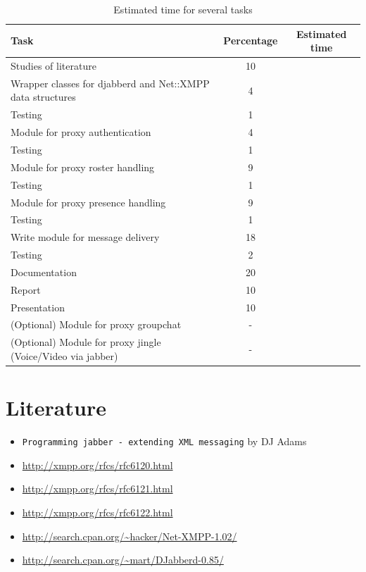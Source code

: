 \documentclass[a4paper,10pt,numbers=noendperiod]{scrartcl}
\begin{document}
\begin{table}[h]
	\centering
	\begin{tabular}{|l|c|c|}
	\hline
	\textbf{Task} & \textbf{Percentage} & \textbf{Estimated time} \\
	\hline
	\hline
	Studies of literature & 10 & \\
	\hline
	Wrapper classes for djabberd and Net::XMPP data structures & 4 & \\
	Testing & 1 & \\
	\hline
	Module for proxy authentication & 4 & \\
	Testing & 1 & \\
	\hline
	Module for proxy roster handling & 9 & \\ 
	Testing & 1 & \\ 
	\hline
	Module for proxy presence handling & 9 & \\ 
	Testing & 1 & \\ 
	\hline
	Write module for message delivery & 18 & \\
	Testing & 2 & \\
	\hline
	Documentation & 20 & \\
	\hline
        Report & 10 & \\
	\hline
	Presentation & 10 & \\
	\hline
	(Optional) Module for proxy groupchat & - & \\
	\hline
	(Optional) Module for proxy jingle (Voice/Video via jabber) & - & \\
	\hline
	\end{tabular}
	\caption{Estimated time for several tasks}
	\label{tab:estimatedtime}
\end{table}


\section{Literature}
\begin{itemize}
	\item \texttt{Programming jabber - extending XML messaging} by DJ Adams\\
	\item \url{http://xmpp.org/rfcs/rfc6120.html}\\
	\item \url{http://xmpp.org/rfcs/rfc6121.html}\\
	\item \url{http://xmpp.org/rfcs/rfc6122.html}\\
	\item \url{http://search.cpan.org/~hacker/Net-XMPP-1.02/}\\
	\item \url{http://search.cpan.org/~mart/DJabberd-0.85/}\\
\end{itemize}
\end{document}
